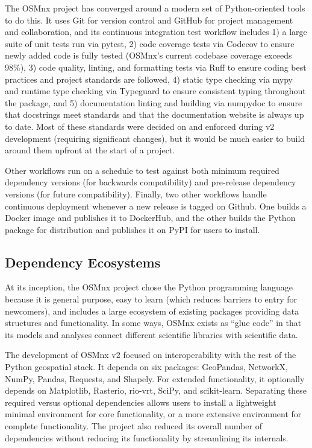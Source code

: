\documentclass[12pt,letterpaper]{article} %
\begin{document}
The OSMnx project has converged around a modern set of Python-oriented tools to do this. It uses Git for version control and GitHub for project management and collaboration, and its continuous integration test workflow includes 1) a large suite of unit tests run via pytest, 2) code coverage tests via Codecov to ensure newly added code is fully tested (OSMnx's current codebase coverage exceeds 98\%), 3) code quality, linting, and formatting tests via Ruff to ensure coding best practices and project standards are followed, 4) static type checking via mypy and runtime type checking via Typeguard to ensure consistent typing throughout the package, and 5) documentation linting and building via numpydoc to ensure that docstrings meet standards and that the documentation website is always up to date. Most of these standards were decided on and enforced during v2 development (requiring significant changes), but it would be much easier to build around them upfront at the start of a project.

Other workflows run on a schedule to test against both minimum required dependency versions (for backwards compatibility) and pre-release dependency versions (for future compatibility). Finally, two other workflows handle continuous deployment whenever a new release is tagged on Github. One builds a Docker image and publishes it to DockerHub, and the other builds the Python package for distribution and publishes it on PyPI for users to install.

\subsection{Dependency Ecosystems}

At its inception, the OSMnx project chose the Python programming language because it is general purpose, easy to learn (which reduces barriers to entry for newcomers), and includes a large ecosystem of existing packages providing data structures and functionality. In some ways, OSMnx exists as \enquote{glue code} in that its models and analyses connect different scientific libraries with scientific data.

The development of OSMnx v2 focused on interoperability with the rest of the Python geospatial stack. It depends on six packages: GeoPandas, NetworkX, NumPy, Pandas, Requests, and Shapely. For extended functionality, it optionally depends on Matplotlib, Rasterio, rio-vrt, SciPy, and scikit-learn. Separating these required versus optional dependencies allows users to install a lightweight minimal environment for core functionality, or a more extensive environment for complete functionality. The project also reduced its overall number of dependencies without reducing its functionality by streamlining its internals.
\end{document}
